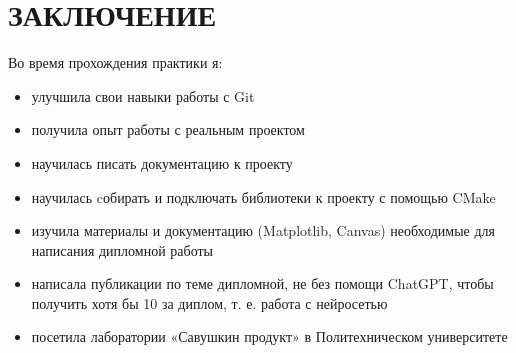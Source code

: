 \chapter{ ЗАКЛЮЧЕНИЕ    }
\label{ch:concl}

Во время прохождения практики я:
\begin{itemize}
    \item улучшила свои навыки работы с Git
    \item получила опыт работы с реальным проектом
    \item научилась писать документацию к проекту
    \item научилась cобирать и подключать библиотеки к проекту с помощью CMake
    \item изучила материалы и документацию (Matplotlib, Canvas) необходимые для написания дипломной работы
    \item написала публикации по теме дипломной, не без помощи ChatGPT, чтобы получить хотя бы 10 за диплом, т. е. работа с нейросетью
    \item посетила лаборатории «Савушкин продукт» в Политехническом университете
\end{itemize}